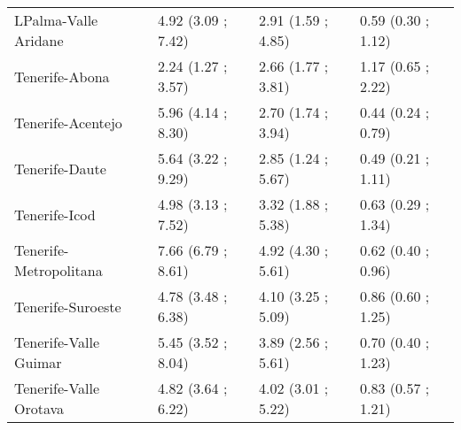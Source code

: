 \begin{table}[ht]
\begin{tabular}{llll}
  LPalma-Valle Aridane & 4.92 (3.09 ; 7.42) & 2.91 (1.59 ; 4.85) & 0.59 (0.30 ; 1.12) \\ 
  Tenerife-Abona  & 2.24 (1.27 ; 3.57) & 2.66 (1.77 ; 3.81) & 1.17 (0.65 ; 2.22) \\ 
  Tenerife-Acentejo  & 5.96 (4.14 ; 8.30) & 2.70 (1.74 ; 3.94) & 0.44 (0.24 ; 0.79) \\ 
  Tenerife-Daute & 5.64 (3.22 ; 9.29) & 2.85 (1.24 ; 5.67) & 0.49 (0.21 ; 1.11) \\ 
  Tenerife-Icod & 4.98 (3.13 ; 7.52) & 3.32 (1.88 ; 5.38) & 0.63 (0.29 ; 1.34) \\ 
  Tenerife-Metropolitana  & 7.66 (6.79 ; 8.61) & 4.92 (4.30 ; 5.61) & 0.62 (0.40 ; 0.96) \\ 
  Tenerife-Suroeste  & 4.78 (3.48 ; 6.38) & 4.10 (3.25 ; 5.09) & 0.86 (0.60 ; 1.25) \\ 
  Tenerife-Valle Guimar  & 5.45 (3.52 ; 8.04) & 3.89 (2.56 ; 5.61) & 0.70 (0.40 ; 1.23) \\ 
  Tenerife-Valle Orotava  & 4.82 (3.64 ; 6.22) & 4.02 (3.01 ; 5.22) & 0.83 (0.57 ; 1.21) \\ 
   \hline
\end{tabular}
\end{table}

